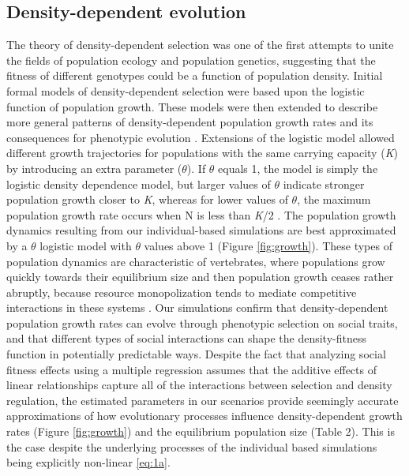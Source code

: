 \documentclass{article}
\begin{document}
\subsection{Density-dependent evolution}
The theory of density-dependent selection was one of the first attempts to unite the fields of population ecology and population genetics, suggesting that the fitness of different genotypes could be a function of population density. Initial formal models of density-dependent selection \citep{Anderson1971, Charlesworth1971} were based upon the logistic function of population growth. These models were then extended to describe more general patterns of density-dependent population growth rates \citep{Gilpin1973a} and its consequences for phenotypic evolution \citep{Gilpin1976}. Extensions of the logistic model allowed different growth trajectories for populations with the same carrying capacity (\textit{K}) by introducing an extra parameter ($\theta$). If $\theta$ equals 1, the model is simply the logistic density dependence model, but larger values of $\theta$ indicate stronger population growth closer to \textit{K}, whereas for lower values of $\theta$, the maximum population growth rate occurs when N is less than \textit{K}/2 \citep{Lande2003}. The population growth dynamics resulting from our individual-based simulations are best approximated by a $\theta$ logistic model with $\theta$ values above 1 (Figure \ref{fig:growth}). These types of population dynamics are characteristic of vertebrates, where populations grow quickly towards their equilibrium size and then population growth ceases rather abruptly, because resource monopolization tends to mediate competitive interactions in these systems \citep{Gilpin1973a}. Our simulations  confirm that density-dependent population growth rates can evolve through phenotypic selection on social traits, and that different types of social interactions can shape the density-fitness function in potentially predictable ways. Despite the fact that analyzing social fitness effects using a multiple regression assumes that the additive effects of linear relationships capture all of the interactions between selection and density regulation, the estimated parameters in our scenarios provide seemingly accurate approximations of how evolutionary processes influence density-dependent growth rates (Figure \ref{fig:growth}) and the equilibrium population size (Table 2). This is the case despite the underlying processes of the individual based simulations being explicitly non-linear \ref{eq:1a}. 
\end{document}
